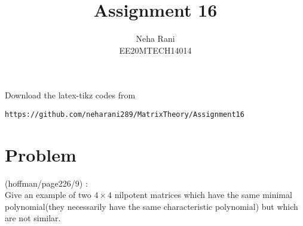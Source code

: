 \documentclass[journal,12pt]{IEEEtran}
\begin{document}
     \def\rightbox#1{\makebox[0in][r]{#1}}
     \def\centbox#1{\makebox[0in]{#1}}
     \def\topbox#1{\raisebox{-\baselineskip}[0in][0in]{#1}}
     \def\midbox#1{\raisebox{-0.5\baselineskip}[0in][0in]{#1}}
\vspace{3cm}
\title{Assignment 16}
\author{Neha Rani\\EE20MTECH14014}
\maketitle
\bigskip
\renewcommand{\thefigure}{\theenumi}
\renewcommand{\thetable}{\theenumi}
%
Download the latex-tikz codes from 
%
\begin{lstlisting}
https://github.com/neharani289/MatrixTheory/Assignment16
\end{lstlisting}
\section{\textbf{Problem}}
%
(hoffman/page226/9) : \\
Give an example of two $4\times 4$ nilpotent matrices which have the same minimal polynomial(they necessarily have the same characteristic polynomial) but which are not similar. 
\bigskip
\end{document}
